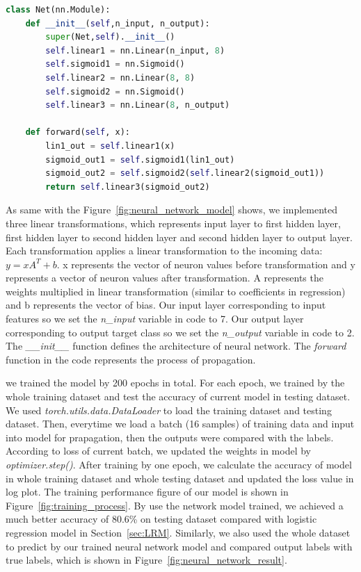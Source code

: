 \documentclass[final-report]{report-template}
\begin{document}
\begin{lstlisting}[language=Python]
    class Net(nn.Module):
    def __init__(self,n_input, n_output):
        super(Net,self).__init__()
        self.linear1 = nn.Linear(n_input, 8)
        self.sigmoid1 = nn.Sigmoid()
        self.linear2 = nn.Linear(8, 8)
        self.sigmoid2 = nn.Sigmoid()
        self.linear3 = nn.Linear(8, n_output)

    def forward(self, x):
        lin1_out = self.linear1(x)
        sigmoid_out1 = self.sigmoid1(lin1_out)
        sigmoid_out2 = self.sigmoid2(self.linear2(sigmoid_out1))
        return self.linear3(sigmoid_out2)
\end{lstlisting}
As same with the Figure~\ref{fig:neural_network_model} shows, we implemented three linear transformations, which represents input layer to first hidden layer, first hidden layer to second hidden layer and second hidden layer to output layer.
Each transformation applies a linear transformation to the incoming data: $y = xA^{T} + b$. x represents the vector of neuron values before transformation and y represents a vector of neuron values after transformation.
A represents the weights multiplied in linear transformation (similar to coefficients in regression) and b represents the vector of bias. 
Our input layer corresponding to input features so we set the \textit{n\_input} variable in code to 7. 
Our output layer corresponding to output target class so we set the \textit{n\_output} variable in code to 2.
The \textit{\_\_init\_\_} function defines the architecture of neural network. The \textit{forward} function in the code represents the process of propagation.

we trained the model by 200 epochs in total. For each epoch, we trained by the whole training dataset and test the accuracy of current model in testing dataset.  We used \textit{torch.utils.data.DataLoader} to load the training dataset and testing dataset.
Then, everytime we load a batch (16 samples) of training data and input into model for prapagation, then the outputs were compared with the labels. According to loss of current batch, we updated the weights in model by \textit{optimizer.step()}.
After training by one epoch, we calculate the accuracy of model in whole training dataset and whole testing dataset and updated the loss value in log plot. The training performance figure of our model is shown in Figure~\ref{fig:training_process}.
By use the network model trained, we achieved a much better accuracy of 80.6\% on testing dataset compared with logistic regression model in Section~\ref{sec:LRM}.
Similarly, we also used the whole dataset to predict by our trained neural network model and compared output labels with true labels, which is shown in Figure~\ref{fig:neural_network_result}.
\end{document}
